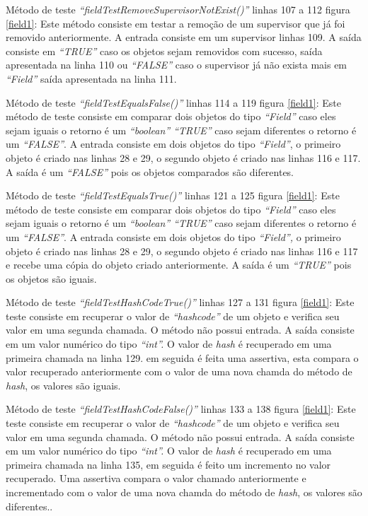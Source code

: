 Método de teste \textit{“fieldTestRemoveSupervisorNotExist()” }linhas 107 a 112 figura \ref{field1}: Este método consiste em testar a remoção de um supervisor que já foi removido anteriormente. A entrada consiste em um supervisor linhas 109. A saída consiste em \textit{“TRUE”} caso os objetos sejam removidos com sucesso, saída apresentada na linha 110 ou \textit{“FALSE”} caso o supervisor já não exista mais em\textit{ “Field” }saída apresentada na linha 111.

Método de teste\textit{ “fieldTestEqualsFalse()”} linhas 114 a 119 figura \ref{field1}: Este método de teste consiste em comparar dois objetos do tipo\textit{ “Field”} caso eles sejam iguais o retorno é um\textit{ “boolean” “TRUE”} caso sejam diferentes o retorno é um\textit{ “FALSE”}. A entrada consiste em dois objetos do tipo\textit{ “Field”}, o primeiro objeto é criado nas linhas 28 e 29, o segundo objeto é criado nas linhas 116 e 117. A saída é um \textit{“FALSE” }pois os objetos comparados são diferentes.

Método de teste \textit{“fieldTestEqualsTrue()” }linhas 121 a 125 figura \ref{field1}: Este método de teste consiste em comparar dois objetos do tipo\textit{ “Field”} caso eles sejam iguais o retorno é um \textit{“boolean” “TRUE”} caso sejam diferentes o retorno é um\textit{ “FALSE”}. A entrada consiste em dois objetos do tipo \textit{“Field”,} o primeiro objeto é criado nas linhas 28 e 29, o segundo objeto é criado nas linhas 116 e 117 e recebe uma cópia do objeto criado anteriormente. A saída é um \textit{“TRUE” }pois os objetos são iguais.

Método de teste \textit{“fieldTestHashCodeTrue()” }linhas 127 a 131 figura \ref{field1}: Este teste consiste em recuperar o valor de \textit{“hashcode” }de um objeto e verifica seu valor em uma segunda chamada. O método não possui entrada. A saída consiste em um valor numérico do tipo \textit{“int”.} O valor de \textit{hash} é recuperado em uma primeira chamada na  linha 129. em seguida é feita uma assertiva, esta compara o valor recuperado anteriormente com o valor de uma nova chamda do método de \textit{hash}, os valores são iguais.

Método de teste\textit{ “fieldTestHashCodeFalse()”} linhas 133 a 138 figura \ref{field1}: Este teste consiste em recuperar o valor de\textit{ “hashcode”} de um objeto e verifica seu valor em uma segunda chamada. O método não possui entrada. A saída consiste em um valor numérico do tipo \textit{“int”.} O valor de \textit{hash} é recuperado em uma primeira chamada na linha 135, em seguida é feito um incremento no valor recuperado. Uma assertiva compara o valor chamado anteriormente e incrementado com o valor de uma nova chamda do método de \textit{hash}, os valores são diferentes..

